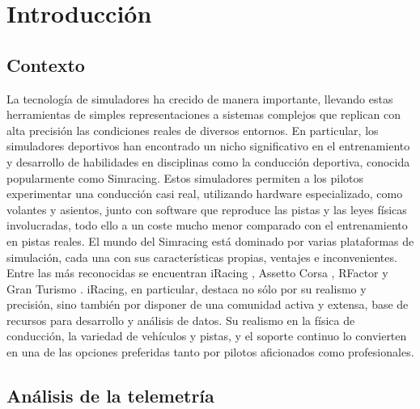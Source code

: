 \chapter{Introducción}
\label{cap:Introduccion}

\section{Contexto}

La tecnología de simuladores ha crecido de manera importante, llevando estas herramientas de simples representaciones a sistemas complejos que replican con alta precisión las condiciones reales de diversos entornos. En particular, los simuladores deportivos han encontrado un nicho significativo en el entrenamiento y desarrollo de habilidades en disciplinas como la conducción deportiva, conocida popularmente como Simracing. Estos simuladores permiten a los pilotos experimentar una conducción casi real, utilizando hardware especializado, como volantes y asientos, junto con software que reproduce las pistas y las leyes físicas involucradas, todo ello a un coste mucho menor comparado con el entrenamiento en pistas reales. El mundo del Simracing está dominado por varias plataformas de simulación, cada una con sus características propias, ventajes e inconvenientes. Entre las más reconocidas se encuentran iRacing \cite{iRacing}, Assetto Corsa \cite{AssetoCorsa}, RFactor \cite{rFactor} y Gran Turismo \cite{granTurismo}. iRacing, en particular,  destaca no sólo por su realismo y precisión, sino también por disponer de una comunidad activa y extensa, base de recursos para desarrollo y análisis de datos. Su realismo en la física de conducción, la variedad de vehículos y pistas, y el soporte continuo lo convierten en una de las opciones preferidas tanto por pilotos aficionados como profesionales.

\section{Análisis de la telemetría}

